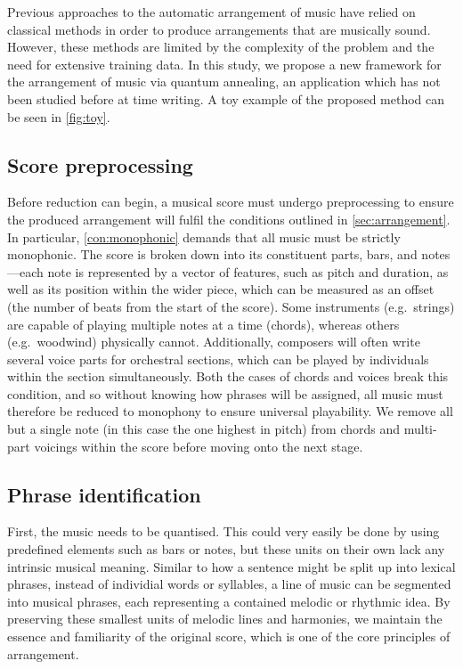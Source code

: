 \documentclass[12pt]{article}
\theoremstyle{definition}
\begin{document}
Previous approaches to the automatic arrangement of music have relied on classical methods in order to produce arrangements that are musically sound. However, these methods are limited by the complexity of the problem and the need for extensive training data. In this study, we propose a new framework for the arrangement of music via quantum annealing, an application which has not been studied before at time writing. A toy example of the proposed method can be seen in \cref{fig:toy}.

\subsection{Score preprocessing}

Before reduction can begin, a musical score must undergo preprocessing to ensure the produced arrangement will fulfil the conditions outlined in \cref{sec:arrangement}. In particular, \cref{con:monophonic} demands that all music must be strictly monophonic. The score is broken down into its constituent parts, bars, and notes---each note is represented by a vector of features, such as pitch and duration, as well as its position within the wider piece, which can be measured as an offset (the number of beats from the start of the score). Some instruments (e.g.\ strings) are capable of playing multiple notes at a time (chords), whereas others (e.g.\ woodwind) physically cannot. Additionally, composers will often write several voice parts for orchestral sections, which can be played by individuals within the section simultaneously. Both the cases of chords and voices break this condition, and so without knowing how phrases will be assigned, all music must therefore be reduced to monophony to ensure universal playability. We remove all but a single note (in this case the one highest in pitch) from chords and multi-part voicings within the score before moving onto the next stage.

\subsection{Phrase identification}

First, the music needs to be quantised. This could very easily be done by using predefined elements such as bars or notes, but these units on their own lack any intrinsic musical meaning. Similar to how a sentence might be split up into lexical phrases, instead of individial words or syllables, a line of music can be segmented into musical phrases, each representing a contained melodic or rhythmic idea. By preserving these smallest units of melodic lines and harmonies, we maintain the essence and familiarity of the original score, which is one of the core principles of arrangement.
\end{document}
